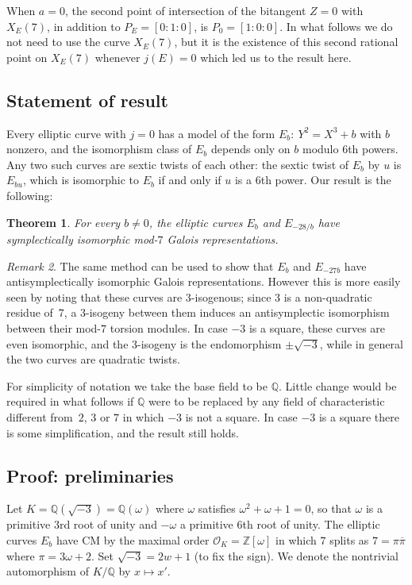 \documentclass[12pt]{amsart}
\newcommand{\Q}{\mathbb{Q}}
\newcommand{\Z}{\mathbb{Z}}
\newcommand{\OO}{\mathscr{O}}
\def\w{\omega}
\def\r3{\sqrt{-3}}
\def\pibar{\overline{\pi}}
\numberwithin{equation}{section}
\newtheorem{theorem}{Theorem}[section]
\theoremstyle{definition}
\theoremstyle{remark}
\newtheorem{remark}[theorem]{Remark}
\begin{document}
When $a=0$, the second point of intersection of the bitangent $Z=0$
with $X_E(7)$, in addition to $P_E=[0:1:0]$, is $P_0=[1:0:0]$.  In
what follows we do not need to use the curve $X_E(7)$, but it is the
existence of this second rational point on $X_E(7)$ whenever $j(E)=0$
which led us to the result here.

\subsection{Statement of result}
Every elliptic curve with $j=0$ has a model of the form
$E_b:\ Y^2=X^3+b$ with $b$ nonzero, and the isomorphism class of $E_b$
depends only on $b$ modulo $6$th powers.  Any two such curves are
sextic twists of each other: the sextic twist of $E_b$ by $u$ is
$E_{bu}$, which is isomorphic to $E_b$ if and only if $u$ is a $6$th
power.  Our result is the following:

\begin{theorem}
For every $b\not=0$, the elliptic curves $E_b$ and $E_{-28/b}$ have
symplectically isomorphic mod-$7$ Galois representations.
\end{theorem}

\begin{remark}
The same method can be used to show that $E_b$ and $E_{-27b}$ have
antisymplectically isomorphic Galois representations.  However this is
more easily seen by noting that these curves are $3$-isogenous; since
$3$ is a non-quadratic residue of~$7$, a $3$-isogeny between them
induces an antisymplectic isomorphism between their mod-$7$ torsion
modules.  In case $-3$ is a square, these curves are even isomorphic,
and the $3$-isogeny is the endomorphism $\pm\r3$, while in
general the two curves are quadratic twists.
\end{remark}

For simplicity of notation we take the base field to be $\Q$.  Little
change would be required in what follows if $\Q$ were to be replaced
by any field of characteristic different from~$2$, $3$ or $7$ in which
$-3$ is not a square.  In case $-3$ is a square there is some
simplification, and the result still holds.

\subsection{Proof: preliminaries}
Let $K=\Q(\r3)=\Q(\w)$ where $\w$ satisfies
$\w^2+\w+1=0$, so that $\w$ is a primitive $3$rd root of
unity and $-\w$ a primitive $6$th root of unity.  The elliptic
curves $E_b$ have CM by the maximal order $\OO_K=\Z[\w]$ in which
$7$ splits as $7=\pi\pibar$ where $\pi=3\w+2$.  Set
$\r3=2w+1$ (to fix the sign).  We denote the nontrivial
automorphism of $K/\Q$ by $x\mapsto x'$.
\end{document}
